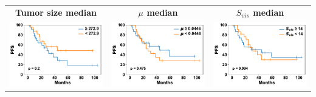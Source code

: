 \begin{tabular}{ccc}
\\[2ex]
\textbf{Tumor size median}
&
\textbf{$\mu$ median}
&
\textbf{$S_{vis}$ median}
\\[1ex]
\includegraphics[width=\coll]{tumor_size_percentiles/50}
&
\includegraphics[width=\coll]{mu/median}
&
\includegraphics[width=\coll]{visible_threshold/median}
\end{tabular}
